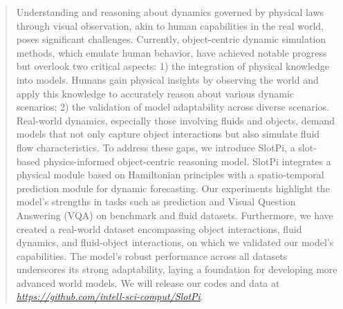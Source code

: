 \documentclass[sigconf]{acmart}
\begin{document}
\author{Hao Sun}


\renewcommand{\shortauthors}{Jian Li et al.}

\begin{abstract}

Understanding and reasoning about dynamics governed by physical laws through visual observation, akin to human capabilities in the real world, poses significant challenges. Currently, object-centric dynamic simulation methods, which emulate human behavior, have achieved notable progress but overlook two critical aspects: 1) the integration of physical knowledge into models. Humans gain physical insights by observing the world and apply this knowledge to accurately reason about various dynamic scenarios; 2) the validation of model adaptability across diverse scenarios. Real-world dynamics, especially those involving fluids and objects, demand models that not only capture object interactions but also simulate fluid flow characteristics. To address these gaps, we introduce SlotPi, a slot-based physics-informed object-centric reasoning model. SlotPi integrates a physical module based on Hamiltonian principles with a spatio-temporal prediction module for dynamic forecasting. Our experiments highlight the model's strengths in tasks such as prediction and Visual Question Answering (VQA) on benchmark and fluid datasets. Furthermore, we have created a real-world dataset encompassing object interactions, fluid dynamics, and fluid-object interactions, on which we validated our model's capabilities. The model's robust performance across all datasets underscores its strong adaptability, laying a foundation for developing more advanced world models. We will release our codes and data at \textit{\url{https://github.com/intell-sci-comput/SlotPi}}.

\end{abstract}

\end{document}
